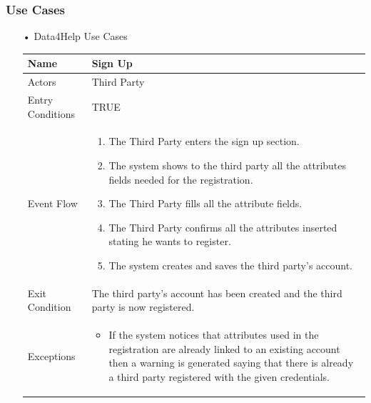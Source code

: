 \subsubsection{Use Cases}
\begin{enumerate}
\FloatBarrier
\item[•]{\Large Data4Help Use Cases}
\FloatBarrier
\begin{table}[h]
\begin{tabular}{|l|p{}|}
\hline
Name             & Sign Up \\ \hline
Actors           & Third Party \\ \hline
Entry Conditions & TRUE    \\ \hline
Event Flow       & \begin{enumerate}
            \item The Third Party enters the sign up section.
            \item The system shows to the third party all the attributes fields needed for the registration.
            \item The Third Party fills all the attribute fields.
            \item The Third Party confirms all the attributes inserted stating he wants to register.
            \item The system creates and saves the third party's account.
        \end{enumerate}\\ \hline
Exit Condition   & The third party's account has been created and the third party is now registered.\\ \hline
Exceptions       & \begin{itemize}
\item If the system notices that attributes used in the registration are already linked to an existing account then a warning is generated saying that there is already a third party registered with the given credentials.
\end{itemize}\\ \hline
\end{tabular}
\end{table}
\FloatBarrier


\end{enumerate}
